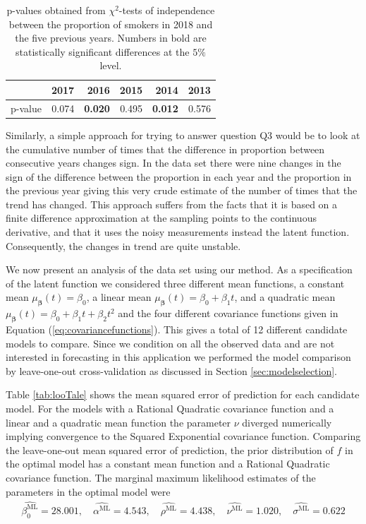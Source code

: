\documentclass[
  11pt,
]{article}
\theoremstyle{nonumberplain}
\begin{document}
\begin{table}[htbp]
\center
\begin{tabular}{c|rrrrr}
 & 2017 & 2016 & 2015 & 2014 & 2013\\ \hline 
p-value & 0.074 & \textbf{0.020} & 0.495 & \textbf{0.012} & 0.576
\end{tabular}
\caption{p-values obtained from $\chi^2$-tests of independence between the proportion of smokers in 2018 and the five previous years. Numbers in bold are statistically significant differences at the $5\%$ level.}
\label{tab:chisqtests}
\end{table}

Similarly, a simple approach for trying to answer question Q3 would be
to look at the cumulative number of times that the difference in
proportion between consecutive years changes sign. In the data set there
were nine changes in the sign of the difference between the proportion
in each year and the proportion in the previous year giving this very
crude estimate of the number of times that the trend has changed. This
approach suffers from the facts that it is based on a finite difference
approximation at the sampling points to the continuous derivative, and
that it uses the noisy measurements instead the latent function.
Consequently, the changes in trend are quite unstable.

We now present an analysis of the data set using our method. As a
specification of the latent function we considered three different mean
functions, a constant mean \(\mu_{\bm{\beta}}(t) = \beta_0\), a linear
mean \(\mu_{\bm{\beta}}(t) = \beta_0 + \beta_1 t\), and a quadratic mean
\(\mu_{\bm{\beta}}(t) = \beta_0 + \beta_1 t + \beta_2 t^2\) and the four
different covariance functions given in Equation
(\ref{eq:covariancefunctions}). This gives a total of 12 different
candidate models to compare. Since we condition on all the observed data
and are not interested in forecasting in this application we performed
the model comparison by leave-one-out cross-validation as discussed in
Section \ref{sec:modelselection}.

Table \ref{tab:looTale} shows the mean squared error of prediction for
each candidate model. For the models with a Rational Quadratic
covariance function and a linear and a quadratic mean function the
parameter \(\nu\) diverged numerically implying convergence to the
Squared Exponential covariance function. Comparing the leave-one-out
mean squared error of prediction, the prior distribution of \(f\) in the
optimal model has a constant mean function and a Rational Quadratic
covariance function. The marginal maximum likelihood estimates of the
parameters in the optimal model were \begin{align}
  \widehat{\beta_0^\text{ML}} = 28.001, \quad \widehat{\alpha^\text{ML}} = 4.543, \quad \widehat{\rho^\text{ML}} = 4.438, \quad \widehat{\nu^\text{ML}} = 1.020, \quad \widehat{\sigma^\text{ML}} = 0.622\label{eq:mlEstimates}
\end{align}
\end{document}
